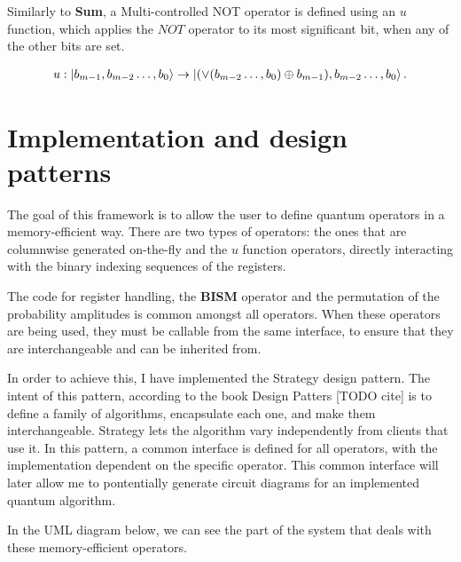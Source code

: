 Similarly to \textbf{Sum}, a Multi-controlled NOT operator is defined using an $u$ function, which applies the $NOT$ operator to its most significant bit, when any of the other bits are set.

\begin{align*}
    u: \ket{b_{m-1},b_{m-2}\dots{},b_0} \rightarrow \ket{(\vee(b_{m-2}\dots{},b_0) \oplus{} b_{m-1}),b_{m-2}\dots{},b_0}.
\end{align*}

\section{Implementation and design patterns}

The goal of this framework is to allow the user to define quantum operators in a memory-efficient way. There are two types of operators: the ones that are columnwise generated on-the-fly and the $u$ function operators, directly interacting with the binary indexing sequences of the registers.

The code for register handling, the \textbf{BISM} operator and the permutation of the probability amplitudes is common amongst all operators. When these operators are being used, they must be callable from the same interface, to ensure that they are interchangeable and can be inherited from.

In order to achieve this, I have implemented the Strategy design pattern. The intent of this pattern, according to the book Design Patters [TODO cite] is to define a family of algorithms, encapsulate each one, and make them interchangeable. Strategy lets the algorithm vary independently from clients that use it. In this pattern, a common interface is defined for all operators, with the implementation dependent on the specific operator. This common interface will later allow me to pontentially generate circuit diagrams for an implemented quantum algorithm.

In the UML diagram below, we can see the part of the system that deals with these memory-efficient operators.

